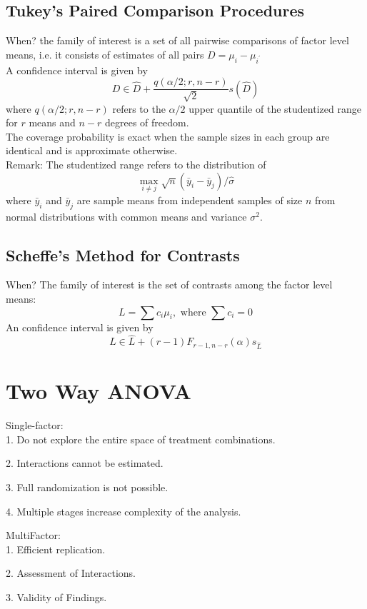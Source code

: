 \documentclass[11pt,a4paper]{article}
\begin{document}
\subsection{Tukey’s Paired Comparison Procedures}
When? the family of interest is a set of all pairwise comparisons of factor level means, i.e. it consists of estimates of all pairs $D=\mu_{i}-\mu_{i^{\prime}}$\\
A confidence interval is given by
$$
D \in \hat{D}+\frac{q(\alpha / 2 ; r, n-r)}{\sqrt{2}} s(\hat{D})
$$
where $q(\alpha / 2 ; r, n-r)$ refers to the $\alpha / 2$ upper quantile of the studentized range for $r$ means and $n-r$ degrees of freedom.\\
The coverage probability is exact when the sample sizes in each group are identical and is approximate otherwise.\\
Remark: The studentized range refers to the distribution of
$$
\max _{i \neq j} \sqrt{n}\left(\bar{y}_{i}-\bar{y}_{j}\right) / \hat{\sigma}
$$
where $\bar{y}_{i}$ and $\bar{y}_{j}$ are sample means from independent samples of size $n$ from normal distributions with common means and variance $\sigma^{2}$.\\

\subsection{Scheffe’s Method for Contrasts}
When? The family of interest is the set of contrasts among the factor level means:
$$
L=\sum c_{i} \mu_{i}, \text { where } \sum c_{i}=0
$$
An confidence interval is given by
$$
L \in \hat{L}+(r-1) F_{r-1, n-r}(\alpha) s_{\hat{L}}
$$


\section{Two Way ANOVA}
Single-factor:\\
1. Do not explore the entire space of treatment combinations.

2. Interactions cannot be estimated.

3. Full randomization is not possible.

4. Multiple stages increase complexity of the analysis.

MultiFactor:\\
1. Eﬃcient replication.

2. Assessment of Interactions.

3. Validity of Findings.
\end{document}
